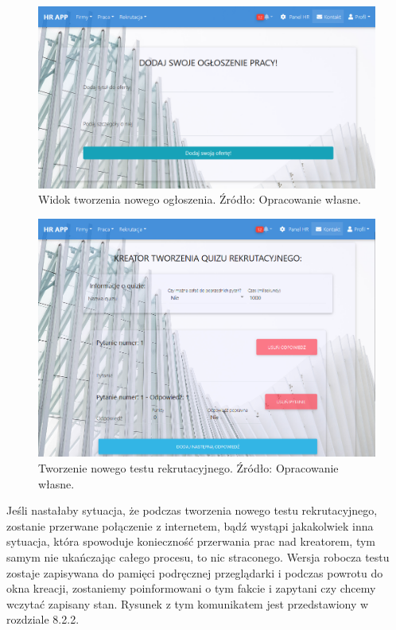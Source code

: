\documentclass[twoside]{projektInzynierskiMS}
\numberwithin{figure}{section}
\begin{document}
\begin{figure}[h!]
    \centering
    \includegraphics[width = \textwidth]{images/dodawanieOgłoszeńPracy.png}
    \caption{Widok tworzenia nowego ogłoszenia. Źródło: Opracowanie własne.}
    \label{fig:okno_tworzenia_ogłoszenia_pracy}
\end{figure}

\begin{figure}[h!]
    \centering
    \includegraphics[scale=0.5]{images/kreatorTworzeniaQuizu.png}
    \caption{Tworzenie nowego testu rekrutacyjnego. Źródło: Opracowanie własne.}
    \label{fig:okno_tworzenia_testu_rekrutacyjnego}
\end{figure}

Jeśli nastałaby sytuacja, że podczas tworzenia nowego testu rekrutacyjnego, zostanie przerwane połączenie z internetem, bądź wystąpi jakakolwiek inna sytuacja, która spowoduje konieczność przerwania prac nad kreatorem, tym samym nie ukańczając całego procesu, to nic straconego. Wersja robocza testu zostaje zapisywana do pamięci podręcznej przeglądarki i podczas powrotu do okna kreacji, zostaniemy poinformowani o tym fakcie i zapytani czy chcemy wczytać zapisany stan. Rysunek z tym komunikatem jest przedstawiony w rozdziale 8.2.2.
\end{document}
